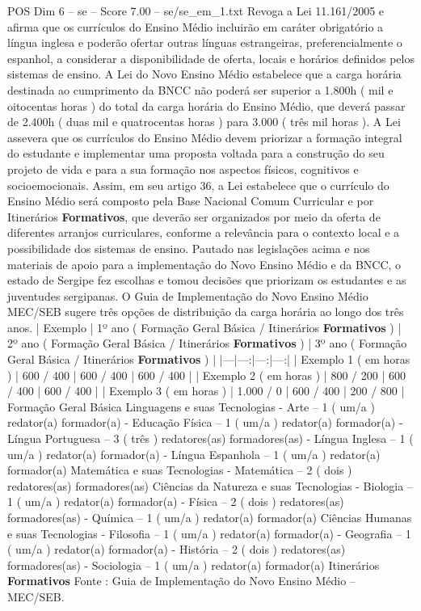 \begin{textsample}{POS Dim 6 – se – Score 7.00 – se/se\_em\_1.txt}
Revoga a Lei 11.161/2005 e afirma que os currículos do Ensino Médio incluirão em caráter obrigatório a língua inglesa e poderão ofertar outras línguas estrangeiras, preferencialmente o espanhol, a considerar a disponibilidade de oferta, locais e horários definidos pelos sistemas de ensino.
A Lei do Novo Ensino Médio estabelece que a carga horária destinada ao cumprimento da BNCC não poderá ser superior a 1.800h ( mil e oitocentas horas ) do total da carga horária do Ensino Médio, que deverá passar de 2.400h ( duas mil e quatrocentas horas ) para 3.000 ( três mil horas ).
A Lei assevera que os currículos do Ensino Médio devem priorizar a formação integral do estudante e implementar uma proposta voltada para a construção do seu projeto de vida e para a sua formação nos aspectos físicos, cognitivos e socioemocionais.
Assim, em seu artigo 36, a Lei estabelece que o currículo do Ensino Médio será composto pela Base Nacional Comum Curricular e por Itinerários \textbf{Formativos}, que deverão ser organizados por meio da oferta de diferentes arranjos curriculares, conforme a relevância para o contexto local e a possibilidade dos sistemas de ensino.
Pautado nas legislações acima e nos materiais de apoio para a implementação do Novo Ensino Médio e da BNCC, o estado de Sergipe fez escolhas e tomou decisões que priorizam os estudantes e as juventudes sergipanas.
O Guia de Implementação do Novo Ensino Médio MEC/SEB sugere três opções de distribuição da carga horária ao longo dos três anos. | Exemplo | 1º ano ( Formação Geral Básica / Itinerários \textbf{Formativos} ) | 2º ano ( Formação Geral Básica / Itinerários \textbf{Formativos} ) | 3º ano ( Formação Geral Básica / Itinerários \textbf{Formativos} ) | |---|---:|---:|---:| | Exemplo 1 ( em horas ) | 600 / 400 | 600 / 400 | 600 / 400 | | Exemplo 2 ( em horas ) | 800 / 200 | 600 / 400 | 600 / 400 | | Exemplo 3 ( em horas ) | 1.000 / 0 | 600 / 400 | 200 / 800 | Formação Geral Básica Linguagens e suas Tecnologias - Arte – 1 ( um/a ) redator(a) formador(a) - Educação Física – 1 ( um/a ) redator(a) formador(a) - Língua Portuguesa – 3 ( três ) redatores(as) formadores(as) - Língua Inglesa – 1 ( um/a ) redator(a) formador(a) - Língua Espanhola – 1 ( um/a ) redator(a) formador(a) Matemática e suas Tecnologias - Matemática – 2 ( dois ) redatores(as) formadores(as) Ciências da Natureza e suas Tecnologias - Biologia – 1 ( um/a ) redator(a) formador(a) - Física – 2 ( dois ) redatores(as) formadores(as) - Química – 1 ( um/a ) redator(a) formador(a) Ciências Humanas e suas Tecnologias - Filosofia – 1 ( um/a ) redator(a) formador(a) - Geografia – 1 ( um/a ) redator(a) formador(a) - História – 2 ( dois ) redatores(as) formadores(as) - Sociologia – 1 ( um/a ) redator(a) formador(a) Itinerários \textbf{Formativos} Fonte : Guia de Implementação do Novo Ensino Médio – MEC/SEB.

\end{textsample}
